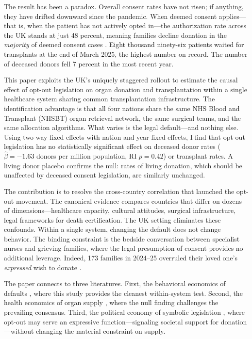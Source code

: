 \documentclass[12pt]{article}
\begin{document}
The result has been a paradox. Overall consent rates have not risen; if anything, they have drifted downward since the pandemic. When deemed consent applies---that is, when the patient has not actively opted in---the authorization rate across the UK stands at just 48 percent, meaning families decline donation in the \textit{majority} of deemed consent cases \citep{nhsbt2025}. Eight thousand ninety-six patients waited for transplants at the end of March 2025, the highest number on record. The number of deceased donors fell 7 percent in the most recent year.

This paper exploits the UK's uniquely staggered rollout to estimate the causal effect of opt-out legislation on organ donation and transplantation within a single healthcare system sharing common transplantation infrastructure. The identification advantage is that all four nations share the same NHS Blood and Transplant (NHSBT) organ retrieval network, the same surgical teams, and the same allocation algorithms. What varies is the legal default---and nothing else. Using two-way fixed effects with nation and year fixed effects, I find that opt-out legislation has no statistically significant effect on deceased donor rates ($\hat{\beta} = -1.63$ donors per million population, RI $p = 0.42$) or transplant rates. A living donor placebo confirms the null: rates of living donation, which should be unaffected by deceased consent legislation, are similarly unchanged.

The contribution is to resolve the cross-country correlation that launched the opt-out movement. The canonical evidence \citep{johnson2003defaults,abadie2006impact} compares countries that differ on dozens of dimensions---healthcare capacity, cultural attitudes, surgical infrastructure, legal frameworks for death certification. The UK setting eliminates these confounds. Within a single system, changing the default does not change behavior. The binding constraint is the bedside conversation between specialist nurses and grieving families, where the legal presumption of consent provides no additional leverage. Indeed, 173 families in 2024--25 overruled their loved one's \textit{expressed} wish to donate \citep{nhsbt2025}.

The paper connects to three literatures. First, the behavioral economics of defaults \citep{madrian2001power,johnson2003defaults,thaler2008nudge}, where this study provides the cleanest within-system test. Second, the health economics of organ supply \citep{abadie2006impact,bilgel2012impact,shepherd2014opt}, where the null finding challenges the prevailing consensus. Third, the political economy of symbolic legislation \citep{sunstein2014nudging}, where opt-out may serve an expressive function---signaling societal support for donation---without changing the material constraint on supply.
\end{document}
